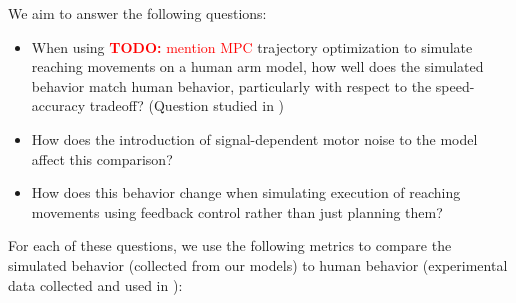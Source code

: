 \documentclass[letterpaper, 10pt, conference]{ieeeconf}
\newcommand{\todo}[1]{\textcolor{red}{\textbf{TODO:} #1}}
\begin{document}
We aim to answer the following questions: 
\begin{itemize}
    \item When using \todo{mention MPC} trajectory optimization to simulate reaching movements on a human arm model, how well does the simulated behavior match human behavior, particularly with respect to the speed-accuracy tradeoff? (Question studied in \cite{original_paper_high_fidelity})

    \item How does the introduction of signal-dependent motor noise to the model affect this comparison?

    \item How does this behavior change when simulating execution of reaching movements using feedback control rather than just planning them?
\end{itemize}
For each of these questions, we use the following metrics to compare the simulated behavior (collected from our models) to human behavior (experimental data collected and used in \cite{original_paper_high_fidelity}):
\end{document}
